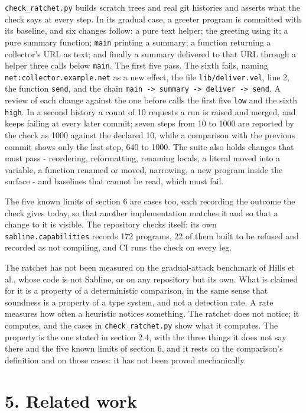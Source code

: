 \documentclass[
]{article}
\begin{document}
\texttt{check\_ratchet.py} builds scratch trees and real git histories
and asserts what the check says at every step. In its gradual case, a
greeter program is committed with its baseline, and six changes follow:
a pure text helper; the greeting using it; a pure summary function;
\texttt{main} printing a summary; a function returning a collector's URL
as text; and finally a summary delivered to that URL through a helper
three calls below \texttt{main}. The first five pass. The sixth fails,
naming \texttt{net:collector.example.net} as a new effect, the file
\texttt{lib/deliver.vel}, line 2, the function \texttt{send}, and the
chain
\texttt{main\ -\textgreater{}\ summary\ -\textgreater{}\ deliver\ -\textgreater{}\ send}.
A review of each change against the one before calls the first five
\texttt{low} and the sixth \texttt{high}. In a second history a count of
10 requests a run is raised and merged, and keeps failing at every later
commit; seven steps from 10 to 1000 are reported by the check as 1000
against the declared 10, while a comparison with the previous commit
shows only the last step, 640 to 1000. The suite also holds changes that
must pass - reordering, reformatting, renaming locals, a literal moved
into a variable, a function renamed or moved, narrowing, a new program
inside the surface - and baselines that cannot be read, which must fail.

The five known limits of section 6 are cases too, each recording the
outcome the check gives today, so that another implementation matches it
and so that a change to it is visible. The repository checks itself: its
own \texttt{sabline.capabilities} records 172 programs, 22 of them built
to be refused and recorded as not compiling, and CI runs the check on
every leg.

The ratchet has not been measured on the gradual-attack benchmark of
Hills et al., whose code is not Sabline, or on any repository but its
own. What is claimed for it is a property of a deterministic comparison,
in the same sense that soundness is a property of a type system, and not
a detection rate. A rate measures how often a heuristic notices
something. The ratchet does not notice; it computes, and the cases in
\texttt{check\_ratchet.py} show what it computes. The property is the
one stated in section 2.4, with the three things it does not say there
and the five known limits of section 6, and it rests on the comparison's
definition and on those cases: it has not been proved mechanically.

\section{5. Related work}\label{related-work}
\end{document}
